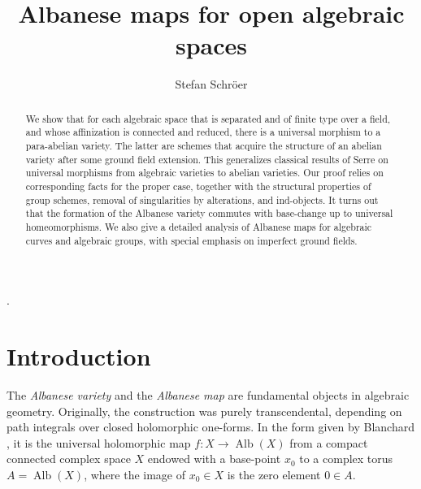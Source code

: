 \documentclass[oneside, 12pt]{amsart}
\newcommand\mylabel[1]{\label{#1}\marginpar{\vspace{-1ex}\medskip\medskip\footnotesize \tt #1}}
\renewcommand\mylabel[1]{\label{#1}}
\theoremstyle{definition}
\theoremstyle{remark}
\newcommand{\Alb}{\operatorname{Alb}}
\newcommand{\ra}{\rightarrow}
\begin{document}
\title[Albanese maps]
      {Albanese maps for open algebraic spaces}.

\author[Stefan Schr\"oer]{Stefan Schr\"oer}
\address{Mathematisches Institut, Heinrich-Heine-Universit\"at, 40204 D\"usseldorf, Germany}
\curraddr{}




\begin{abstract}
We show that for each algebraic space that is separated and of finite type over a field, and whose affinization
is   connected and reduced, 
there is a universal morphism to a para-abelian variety. The latter are schemes that acquire  the structure
of an  abelian variety after  some ground field extension. This generalizes  classical results   of Serre on universal morphisms
from algebraic varieties to abelian varieties. Our proof relies on   corresponding facts for
the proper case, together with the structural properties of group schemes,  removal of singularities by alterations,
and ind-objects.
It turns out that the formation of the Albanese variety commutes with base-change up to universal homeomorphisms.
We also give a detailed analysis of    Albanese maps   for   algebraic curves and algebraic groups, with special emphasis on 
imperfect ground fields.
\end{abstract}


\maketitle
\tableofcontents
 
 
\section*{Introduction}
\mylabel{Introduction}

The \emph{Albanese variety} and the \emph{Albanese map} are   fundamental objects in algebraic geometry.
Originally, the construction was  purely  transcendental, depending on  path integrals over closed holomorphic one-forms.
In the form given by Blanchard \cite{Blanchard 1956}, it is the universal holomorphic map $f:X\ra \Alb(X)$ 
from a compact connected  complex space $X$ endowed
with a base-point $x_0$ to a complex torus $A=\Alb(X)$, where the image of $x_0\in X$ is the zero element $0\in A$.
\end{document}
